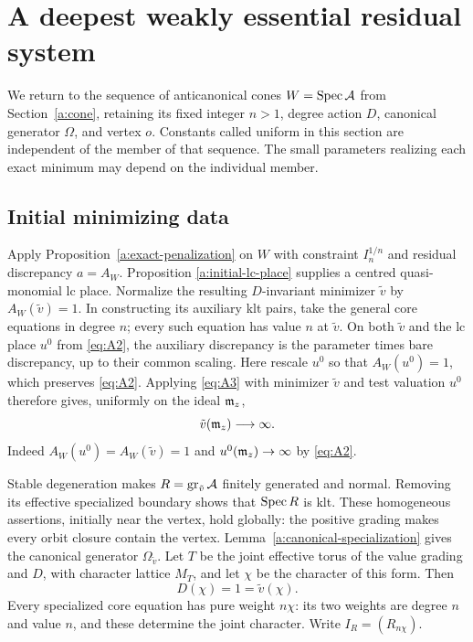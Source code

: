\section{A deepest weakly essential residual system}
\label{a:essential}

We return to the sequence of anticanonical cones \(W=\operatorname{Spec}\mathcal A\)
from Section~\ref{a:cone}, retaining its fixed integer \(n>1\), degree
action \(D\), canonical generator \(\Omega\), and vertex \(o\).
Constants called uniform in this section are independent of the member
of that sequence. The small parameters realizing each exact minimum may
depend on the individual member.

\subsection{Initial minimizing data}

Apply Proposition~\ref{a:exact-penalization} on \(W\) with constraint
\(I_n^{1/n}\) and residual discrepancy \(a=A_W\). Proposition
\ref{a:initial-lc-place} supplies a centred quasi-monomial lc place.
Normalize the resulting \(D\)-invariant minimizer \(\tilde v\) by
\(A_W(\tilde v)=1\). In constructing its auxiliary klt pairs, take
the general core equations in degree \(n\); every such equation has
value \(n\) at \(\tilde v\). On both \(\tilde v\) and the lc place
\(u^0\) from \eqref{eq:A2}, the auxiliary discrepancy is the parameter
times bare discrepancy, up to their common scaling. Here rescale
\(u^0\) so that \(A_W(u^0)=1\), which preserves \eqref{eq:A2}. Applying
\eqref{eq:A3} with minimizer \(\tilde v\) and test valuation \(u^0\)
therefore gives, uniformly on the ideal \(\mathfrak m_z\),
\begin{equation}
                         \tilde v(\mathfrak m_z)\longrightarrow\infty.
 \label{eq:A7}
\end{equation}
Indeed \(A_W(u^0)=A_W(\tilde v)=1\) and
\(u^0(\mathfrak m_z)\to\infty\) by \eqref{eq:A2}.

Stable degeneration makes \(R=\operatorname{gr}_{\tilde v}\mathcal A\) finitely
generated and normal. Removing its effective specialized boundary shows
that \(\operatorname{Spec} R\) is klt. These homogeneous assertions, initially near
the vertex, hold globally: the positive grading makes every orbit
closure contain the vertex. Lemma~\ref{a:canonical-specialization}
gives the canonical generator \(\Omega_{\tilde v}\). Let \(T\) be the
joint effective torus of the value grading and \(D\), with character
lattice \(M_T\), and let \(\chi\) be the character of this form. Then
\[
                      D(\chi)=1=\tilde v(\chi).
\]
Every specialized core equation has pure weight \(n\chi\): its two
weights are degree \(n\) and value \(n\), and these determine the
joint character. Write \(I_R=(R_{n\chi})\).


